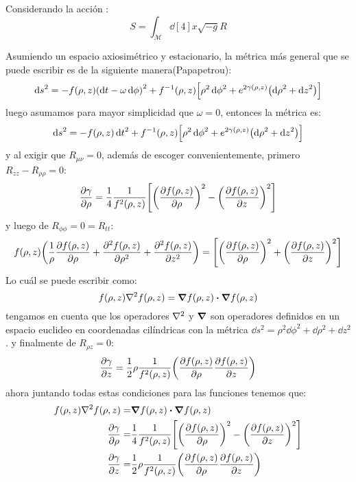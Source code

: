 \documentclass[../Main.tex]{subfiles}
\begin{document}
Considerando la acción :
\begin{equation}
    S=\int_{\mathcal{M}} \dd[4]{x}\sqrt{-g}R
\end{equation}


Asumiendo un espacio axiosimétrico y estacionario, la métrica más general que se puede escribir es de la siguiente manera(Papapetrou):
%
\begin{equation}
    \dd{s}^{2} = -f(\rho,z)\qty(\dd{t}-\omega\dd{\phi})^{2}+f^{-1}(\rho,z)\qty[\rho^{2}\dd{\phi}^{2}+e^{2\gamma(\rho,z)}\qty(\dd{\rho}^{2}+\dd{z}^{2})]
    \label{papapetrou}
\end{equation}
%
luego asumamos para mayor simplicidad que $\omega=0$, entonces la métrica es:
%
\begin{equation}
    \dd{s}^{2} = -f(\rho,z)\dd{t}^{2}+f^{-1}(\rho,z)\qty[\rho^{2}\dd{\phi}^{2}+e^{2\gamma(\rho,z)}\qty(\dd{\rho}^{2}+\dd{z}^{2})]
    \label{metric}
\end{equation}
%
y al exigir que $R_{\mu\nu}=0$, además de escoger convenientemente, primero $R_{zz}-R_{\rho\rho}=0$:
\begin{equation}
    \pdv{\gamma}{\rho}=\dfrac{1}{4}\dfrac{1}{f^{2}(\rho,z)}\qty[\qty(\pdv{f(\rho,z)}{\rho})^{2}-\qty(\pdv{f(\rho,z)}{z})^{2}]
\end{equation}
%
y luego de $R_{\phi\phi}=0=R_{tt}$:
\begin{equation}
    f(\rho,z)\qty(\dfrac{1}{\rho}\pdv{f(\rho,z)}{\rho}+\pdv[2]{f(\rho,z)}{\rho}+\pdv[2]{f(\rho,z)}{z})=\qty[\qty(\pdv{f(\rho,z)}{\rho})^{2}+\qty(\pdv{f(\rho,z)}{z})^{2}]
\end{equation}
%
Lo cuál se puede escribir como:
\begin{equation}
    f(\rho,z)\laplacian{f(\rho,z)}=\grad{f(\rho,z)}\vdot\grad{f(\rho,z)}
\end{equation}
%
tengamos en cuenta que los operadores $\laplacian$ y $\grad$ son operadores definidos en un espacio euclideo en coordenadas cilíndricas con la métrica $\dd{s}^{2} = \rho^{2}\dd{\phi}^{2}+\dd{\rho}^{2}+\dd{z}^{2}$.
%
\newline
%
y finalmente de $R_{\rho z}=0$:
\begin{equation}
    \pdv{\gamma}{z}=\dfrac{1}{2}\rho\dfrac{1}{f^{2}(\rho,z)}\qty(\pdv{f(\rho,z)}{\rho}\pdv{f(\rho,z)}{z})
\end{equation}
%
ahora juntando todas estas condiciones para las funciones tenemos que:
\begin{eqnarray}
    \label{Function_f}
    f(\rho,z)\laplacian{f(\rho,z)}= & \grad{f(\rho,z)}\vdot\grad{f(\rho,z)}\\
    \label{gamma_partial_rho}
    \pdv{\gamma}{\rho}= & \dfrac{1}{4}\dfrac{1}{f^{2}(\rho,z)}\qty[\qty(\pdv{f(\rho,z)}{\rho})^{2}-\qty(\pdv{f(\rho,z)}{z})^{2}] \\
    \label{gamma_partial_z}
    \pdv{\gamma}{z}= & \dfrac{1}{2}\rho\dfrac{1}{f^{2}(\rho,z)}\qty(\pdv{f(\rho,z)}{\rho}\pdv{f(\rho,z)}{z})
\end{eqnarray}
\end{document}
